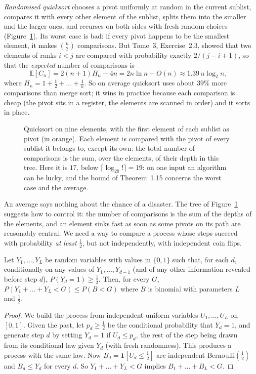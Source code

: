 \emph{Randomised quicksort} chooses a pivot uniformly at random in the current sublist, compares it with every other element of the
sublist, splits them into the smaller and the larger ones, and recurses on both sides with fresh random choices (Figure~\ref{fig:quicksort}). Its
worst case is bad: if every pivot happens to be the smallest element, it makes $\binom n2$ comparisons. But Tome~3, Exercise~2.3, showed that two
elements of ranks $i<j$ are compared with probability exactly $2/(j-i+1)$, so that the \emph{expected} number of comparisons is
\[
\mathbb E[C_n]=2(n+1)H_n-4n=2n\ln n+O(n)\approx1.39\,n\log_2n,
\]
where $H_n=1+\frac12+\dots+\frac1n$. So on average quicksort uses about $39\%$ more comparisons than merge sort; it wins in practice because each
comparison is cheap (the pivot sits in a register, the elements are scanned in order) and it sorts in place.

\begin{figure}[ht]
\centering
{}
\caption{Quicksort on nine elements, with the first element of each sublist as pivot (in orange). Each element is compared with the
pivot of every sublist it belongs to, except its own: the total number of comparisons is the sum, over the elements, of their depth in this
tree. Here it is $17$, below $\lceil\log_29!\rceil=19$: on one input an algorithm can be lucky, and the bound of Theorem~1.15
concerns the worst case and the average.}
\label{fig:quicksort}
\end{figure}

An average says nothing about the chance of a disaster. The tree of Figure~\ref{fig:quicksort} suggests how to control it: the number of comparisons
is the sum of the depths of the elements, and an element sinks fast as soon as some pivots on its path are reasonably central. We need a way to
compare a process whose steps succeed with probability \emph{at least} $\frac12$, but not independently, with independent coin flips.

\begin{lemma}\label{lem:dominate}
Let $Y_1,\dots,Y_L$ be random variables with values in $\{0,1\}$ such that, for each $d$, conditionally on any values of $Y_1,\dots,Y_{d-1}$ (and of
any other information revealed before step $d$), $P(Y_d=1)\ge\frac12$. Then, for every $G$, $P(Y_1+\dots+Y_L<G)\le P(B<G)$ where $B$ is binomial with
parameters $L$ and $\frac12$.
\end{lemma}
\begin{proof}
We build the process from independent uniform variables $U_1,\dots,U_L$ on $[0,1]$. Given the past, let $p_d\ge\frac12$ be the conditional
probability that $Y_d=1$, and generate step $d$ by setting $Y_d=1$ if $U_d\le p_d$, the rest of the step being drawn from its conditional law given
$Y_d$ (with fresh randomness). This produces a process with the same law. Now $B_d=\mathbf 1[U_d\le\frac12]$ are independent Bernoulli$(\frac12)$ and
$B_d\le Y_d$ for every $d$. So $Y_1+\dots+Y_L<G$ implies $B_1+\dots+B_L<G$.
\end{proof}

